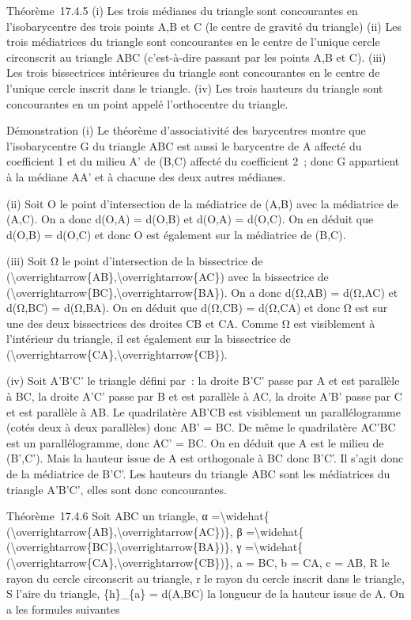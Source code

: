 \documentclass[]{article}
\begin{document}
Théorème~17.4.5 (i) Les trois médianes du triangle sont concourantes en
l'isobarycentre des trois points A,B et C (le centre de gravité du
triangle) (ii) Les trois médiatrices du triangle sont concourantes en le
centre de l'unique cercle circonscrit au triangle ABC (c'est-à-dire
passant par les points A,B et C). (iii) Les trois bissectrices
intérieures du triangle sont concourantes en le centre de l'unique
cercle inscrit dans le triangle. (iv) Les trois hauteurs du triangle
sont concourantes en un point appelé l'orthocentre du triangle.

Démonstration (i) Le théorème d'associativité des barycentres montre que
l'isobarycentre G du triangle ABC est aussi le barycentre de A affecté
du coefficient 1 et du milieu A' de (B,C) affecté du coefficient 2~;
donc G appartient à la médiane AA' et à chacune des deux autres
médianes.

(ii) Soit O le point d'intersection de la médiatrice de (A,B) avec la
médiatrice de (A,C). On a donc d(O,A) = d(O,B) et d(O,A) = d(O,C). On en
déduit que d(O,B) = d(O,C) et donc O est également sur la médiatrice de
(B,C).

(iii) Soit Ω le point d'intersection de la bissectrice de
(\textbackslash{}overrightarrow\{AB\},\textbackslash{}overrightarrow\{AC\})
avec la bissectrice de
(\textbackslash{}overrightarrow\{BC\},\textbackslash{}overrightarrow\{BA\}).
On a donc d(Ω,AB) = d(Ω,AC) et d(Ω,BC) = d(Ω,BA). On en déduit que
d(Ω,CB) = d(Ω,CA) et donc Ω est sur une des deux bissectrices des
droites CB et CA. Comme Ω est visiblement à l'intérieur du triangle, il
est également sur la bissectrice de
(\textbackslash{}overrightarrow\{CA\},\textbackslash{}overrightarrow\{CB\}).

(iv) Soit A'B'C' le triangle défini par~: la droite B'C' passe par A et
est parallèle à BC, la droite A'C' passe par B et est parallèle à AC, la
droite A'B' passe par C et est parallèle à AB. Le quadrilatère AB'CB est
visiblement un parallélogramme (cotés deux à deux parallèles) donc AB' =
BC. De même le quadrilatère AC'BC est un parallélogramme, donc AC' = BC.
On en déduit que A est le milieu de (B',C'). Mais la hauteur issue de A
est orthogonale à BC donc B'C'. Il s'agit donc de la médiatrice de B'C'.
Les hauteurs du triangle ABC sont les médiatrices du triangle A'B'C',
elles sont donc concourantes.

Théorème~17.4.6 Soit ABC un triangle, α =\textbackslash{}widehat\{
(\textbackslash{}overrightarrow\{AB\},\textbackslash{}overrightarrow\{AC\})\},
β =\textbackslash{}widehat\{
(\textbackslash{}overrightarrow\{BC\},\textbackslash{}overrightarrow\{BA\})\},
γ =\textbackslash{}widehat\{
(\textbackslash{}overrightarrow\{CA\},\textbackslash{}overrightarrow\{CB\})\},
a = BC, b = CA, c = AB, R le rayon du cercle circonscrit au triangle, r
le rayon du cercle inscrit dans le triangle, S l'aire du triangle,
\{h\}\_\{a\} = d(A,BC) la longueur de la hauteur issue de A. On a les
formules suivantes
\end{document}
